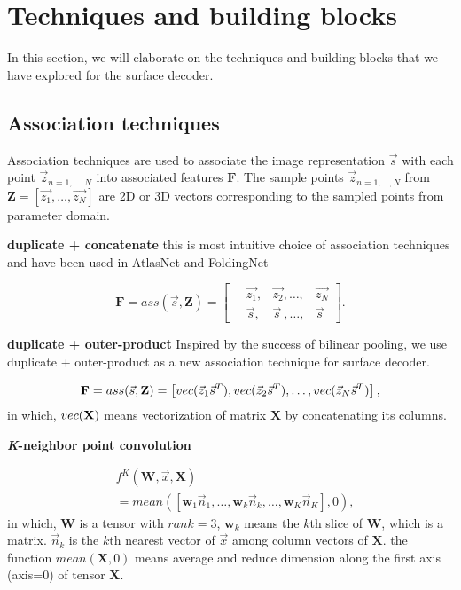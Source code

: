 \section{Techniques and building blocks}
In this section, we will elaborate on the techniques and building blocks that we have explored for the surface decoder. 
\subsection{Association techniques}
Association techniques are used to associate the image representation $\vec{s}$ with each point $\vec{z}_{n={1,\dots,N}}$ into associated features $\mathbf{F}$. The sample points $\vec{z}_{n={1,\dots,N}}$ from $\mathbf{Z}=[\vec{z_1},\dots,\vec{z_N}]$ are 2D or 3D vectors corresponding to the sampled points from parameter domain.

\noindent\textbf{duplicate + concatenate}
this is most intuitive choice of association techniques and have been used in AtlasNet\cite{atlasnet} and FoldingNet\cite{foldingnet}

\begin{equation}
\label{equ:C}
\mathbf{F}=ass(\vec{s},\mathbf{Z})=\left[
\begin{aligned}
~&\vec{z_1},&\vec{z_2},\dots,&\vec{z_N}\\
~&\vec{s}  ,&\vec{s}~,\dots,&\vec{s}
\end{aligned}
\right].
\end{equation}

\noindent\textbf{duplicate + outer-product} 
Inspired by the success of bilinear pooling, we use duplicate + outer-product as a new association technique for surface decoder. 

\begin{equation}
\label{equ:O}
\mathbf{F}=ass(\vec{s},\mathbf{Z})=\left[
~\\vec(\vec{z}_1\vec{s}^T),\\vec(\vec{z}_2\vec{s}^T),\dots,\\vec(\vec{z}_N\vec{s}^T)\\
\right],
\end{equation}in which, $\\vec(\mathbf{X})$ means vectorization of matrix $\mathbf{X}$ by concatenating its columns.

\noindent\textbf{\emph{K}-neighbor point convolution}

\begin{equation}
\begin{aligned}
&f^{K}(\mathbf{W},\vec{x},\mathbf{X})\\
&= mean([\mathbf{w}_1\vec{n}_{1},\dots,\mathbf{w}_k\vec{n}_{k},\dots,\mathbf{w}_K\vec{n}_{K}],0),
\end{aligned}
\end{equation}
in which, $\mathbf{W}$ is a tensor with $rank=3$, $\mathbf{w}_k$ means the $k$th slice of $\mathbf{W}$, which is a matrix. $\vec{n}_{k}$ is the $k$th nearest vector of $\vec{x}$ among column vectors of $\mathbf{X}$.
the function $mean(\mathbf{X},0)$ means average and reduce dimension along the first axis (axis=0) of tensor $\mathbf{X}$.

